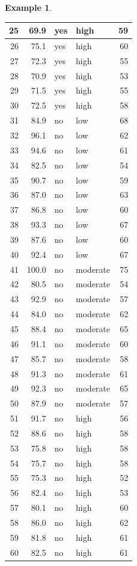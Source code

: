 \documentclass[
  openany]{book}
\theoremstyle{definition}
\theoremstyle{definition}
\newtheorem{example}{Example}[chapter]
\theoremstyle{definition}
\theoremstyle{definition}
\theoremstyle{remark}
\begin{document}
\begin{example}
\begin{tabular}{r|r|l|l|r}
\hline
25 & 69.9 & yes & high & 59\\
\hline
26 & 75.1 & yes & high & 60\\
\hline
27 & 72.3 & yes & high & 55\\
\hline
28 & 70.9 & yes & high & 53\\
\hline
29 & 71.5 & yes & high & 55\\
\hline
30 & 72.5 & yes & high & 58\\
\hline
31 & 84.9 & no & low & 68\\
\hline
32 & 96.1 & no & low & 62\\
\hline
33 & 94.6 & no & low & 61\\
\hline
34 & 82.5 & no & low & 54\\
\hline
35 & 90.7 & no & low & 59\\
\hline
36 & 87.0 & no & low & 63\\
\hline
37 & 86.8 & no & low & 60\\
\hline
38 & 93.3 & no & low & 67\\
\hline
39 & 87.6 & no & low & 60\\
\hline
40 & 92.4 & no & low & 67\\
\hline
41 & 100.0 & no & moderate & 75\\
\hline
42 & 80.5 & no & moderate & 54\\
\hline
43 & 92.9 & no & moderate & 57\\
\hline
44 & 84.0 & no & moderate & 62\\
\hline
45 & 88.4 & no & moderate & 65\\
\hline
46 & 91.1 & no & moderate & 60\\
\hline
47 & 85.7 & no & moderate & 58\\
\hline
48 & 91.3 & no & moderate & 61\\
\hline
49 & 92.3 & no & moderate & 65\\
\hline
50 & 87.9 & no & moderate & 57\\
\hline
51 & 91.7 & no & high & 56\\
\hline
52 & 88.6 & no & high & 58\\
\hline
53 & 75.8 & no & high & 58\\
\hline
54 & 75.7 & no & high & 58\\
\hline
55 & 75.3 & no & high & 52\\
\hline
56 & 82.4 & no & high & 53\\
\hline
57 & 80.1 & no & high & 60\\
\hline
58 & 86.0 & no & high & 62\\
\hline
59 & 81.8 & no & high & 61\\
\hline
60 & 82.5 & no & high & 61\\
\hline
\end{tabular}


\end{example}
\end{document}
